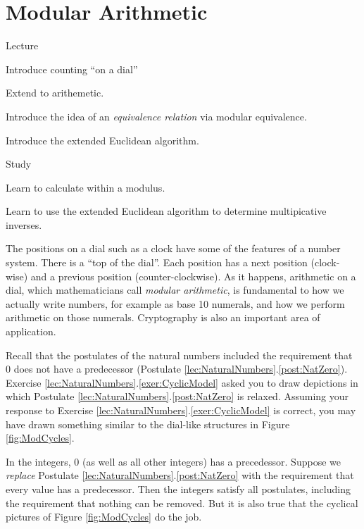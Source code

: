 \chapter{Modular Arithmetic}

\begin{goals} 
	\begin{goal}{Lecture}
		\item Introduce counting ``on a dial''
		\item Extend to arithemetic.
		\item Introduce the idea of an \emph{equivalence relation} via modular equivalence.
		\item Introduce the extended Euclidean algorithm.
	\end{goal}
	
	\begin{goal}{Study}
		\item Learn to calculate within a modulus.
		\item Learn to use the extended Euclidean algorithm to determine multipicative inverses.
	\end{goal}
\end{goals}

The positions on a dial such as a clock have some of the features of a number system. There is a ``top of the dial''. Each position has a next position (clock-wise) and a previous position (counter-clockwise). As it happens, arithmetic on a dial, which mathematicians call \emph{modular arithmetic}, is fundamental to how we actually write numbers, for example as base 10 numerals, and how we perform arithmetic on those numerals. Cryptography is also an important area of application.  
 
Recall that the postulates of the natural numbers included the requirement that $0$ does not have  a predecessor (Postulate \ref{lec:NaturalNumbers}.\ref{post:NatZero}).  Exercise \ref{lec:NaturalNumbers}.\ref{exer:CyclicModel} asked you to draw depictions in which Postulate \ref{lec:NaturalNumbers}.\ref{post:NatZero} is relaxed. 
Assuming your response to Exercise \ref{lec:NaturalNumbers}.\ref{exer:CyclicModel} is correct, you may have drawn something similar to the dial-like structures in Figure \ref{fig:ModCycles}.

In the integers, $0$ (as well as all other integers) has a precedessor. Suppose we \emph{replace} Postulate \ref{lec:NaturalNumbers}.\ref{post:NatZero} with the requirement that every value has a predecessor. 
Then the integers satisfy all postulates, including the requirement that nothing can be removed. But it is also true that the cyclical pictures of Figure \ref{fig:ModCycles} do the job. 

